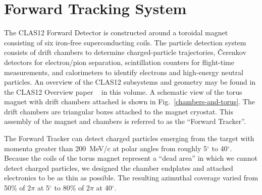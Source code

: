\section{Forward Tracking System}
\label{overview}

The CLAS12 Forward Detector is constructed around a toroidal magnet consisting of six 
iron-free superconducting coils.  The particle detection system consists of drift 
chambers to determine charged-particle trajectories, {\v C}erenkov detectors 
for electron/pion separation, scintillation counters for flight-time 
measurements, and calorimeters to identify electrons and high-energy neutral 
particles.  An overview of the CLAS12 subsystems and geometry may be found in the 
CLAS12 Overview paper ~\cite{clas12-overview} in this volume.  A schematic view of the 
torus magnet with drift chambers
attached is shown in Fig.~\ref{chambers-and-torus}.   The drift chambers are 
triangular boxes attached to the magnet cryostat.  
This assembly of the magnet and chambers is referred to as the ``Forward Tracker''. 

The Forward Tracker can detect charged particles emerging from the target with
momenta greater than 200~MeV/c at polar angles from roughly 5$^{\circ}$ to 
40$^{\circ}$.  Because the coils of the torus magnet represent a ``dead area''
in which we cannot detect charged particles, we designed the chamber endplates
and attached electronics to be as thin as possible.  The resulting azimuthal
coverage varied from 50\% of 2$\pi$ at 5$^{\circ}$ to 80\% of 2$\pi$ at 40$^{\circ}$.


